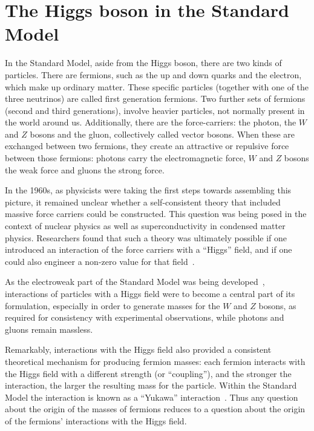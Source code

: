\documentclass[12pt]{article}
\begin{document}
\section{The Higgs boson in the Standard Model}

In the Standard Model, aside from the Higgs boson, there are two kinds
of particles.
%
There are fermions, such as the up and down quarks and the electron,
which make up ordinary matter.
%
These specific particles (together with one of the three neutrinos) are
called first generation fermions.
%
Two further sets of fermions (second and third generations), involve
heavier particles, not normally present in the world around us.
%
Additionally, there are the force-carriers: the photon, the $W$ and
$Z$ bosons and the gluon, collectively called vector bosons.
%
When these are exchanged between two fermions, they create an attractive or repulsive  force
between those fermions: photons carry the electromagnetic force, $W$
and $Z$ bosons the weak force and gluons the strong force.



In the 1960s, as physicists were taking the first steps towards assembling this picture, it remained unclear whether a self-consistent theory that included massive force carriers could be constructed.
%
This question was being posed in the context of nuclear physics as well as superconductivity in condensed matter physics. Researchers found that such a theory was ultimately
possible if one introduced an interaction of the force carriers with
a ``Higgs'' field, and if one could also engineer a non-zero value for
that
field~\cite{Anderson:1963pc,Higgs:1964ia,Higgs:1964pj,Englert:1964et,Guralnik:1964eu,Kibble:1967sv}.
% 

As the electroweak part of the Standard Model was being
developed~\cite{Glashow:1961tr,Salam:1964ry,Weinberg:1967tq}, 
interactions of particles with a Higgs field were to become a central part of 
its formulation, especially in order to generate masses for the $W$
and $Z$ bosons, as required for consistency with experimental
observations, while photons and gluons remain massless.

Remarkably, interactions with the Higgs field also provided a consistent
theoretical mechanism for producing fermion masses:
%
each fermion interacts with the Higgs field with a different strength
(or ``coupling''), and the stronger the interaction, the larger the
resulting mass for the particle.
%
Within the Standard Model
the interaction is known as a ``Yukawa''
interaction~\cite{Yukawa:1935xg}.
%
Thus any question about the origin of the masses of fermions reduces
to a question about the origin of the fermions' interactions with the
Higgs field.
%
\end{document}
